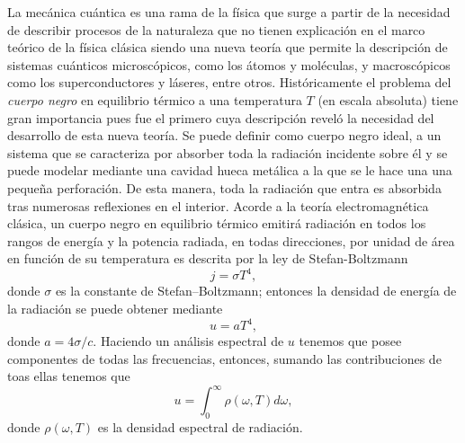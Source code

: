 \documentclass[twocolumn]{article}
\begin{document}
La mecánica cuántica es una rama de la física que surge a partir de la
necesidad de describir procesos de la naturaleza que no tienen explicación en
el marco teórico de la física clásica siendo una nueva teoría que permite la
descripción de sistemas cuánticos microscópicos, como los átomos y moléculas, y
macroscópicos como los superconductores y láseres, entre otros.
% 
Históricamente el problema del \emph{cuerpo negro} en equilibrio térmico a una
temperatura $T$ (en escala absoluta) tiene gran importancia pues fue el primero
cuya descripción reveló la necesidad del desarrollo de esta nueva teoría.
% 
Se puede definir como cuerpo negro ideal, a un sistema que se caracteriza por
absorber toda la radiación incidente sobre él y se puede modelar mediante una
cavidad hueca metálica a la que se le hace una una pequeña perforación. De esta
manera, toda la radiación que entra es absorbida tras numerosas reflexiones en
el interior. Acorde a la teoría electromagnética clásica, un cuerpo negro en
equilibrio térmico emitirá radiación en todos los rangos de energía
\cite{planck2013theory} y la potencia radiada, en todas direcciones, por unidad
de área en función de su temperatura es descrita por la ley de Stefan-Boltzmann
% 
\begin{equation}\label{eq:ley-stefan-boltzmann}
j = \sigma T^{4},
\end{equation}
% 
donde $\sigma$ es la constante de Stefan–Boltzmann; entonces la densidad de
energía de la radiación se puede obtener mediante 
%
\begin{equation}
u= aT^{4},
\end{equation}
donde $a = 4\sigma/c$. Haciendo un análisis espectral de $u$ tenemos que posee
componentes de todas las frecuencias, entonces, sumando las contribuciones de
toas ellas tenemos que 
% 
\begin{equation}
u = \int_{0}^{\infty} \rho(\omega, T)d\omega,
\end{equation}
% 
donde $\rho(\omega, T)$ es la densidad espectral de radiación.





% 

\end{document}
